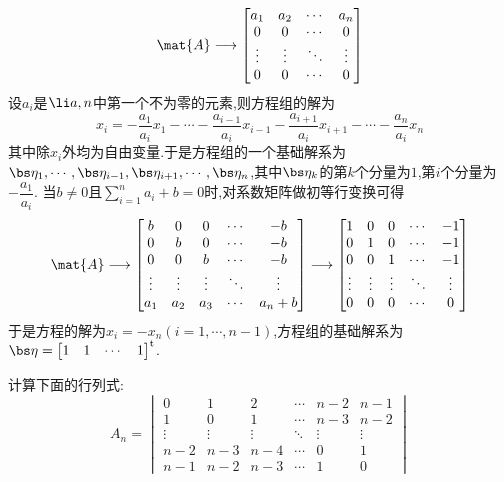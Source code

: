 \documentclass{ctexart}
\begin{document}
\begin{solution}
\begin{enumerate}[label=\tbf{(\arabic*)},topsep=0pt,parsep=0pt,itemsep=0pt,partopsep=0pt]
        \[\mat{A}\longrightarrow\begin{bmatrix}
            a_1&a_2&\cdots&a_n\\
            0&0&\cdots&0\\
            \vdots&\vdots&\ddots&\vdots\\
            0&0&\cdots&0
        \end{bmatrix}\]
        设$a_i$是$\li a,n$中第一个不为零的元素,则方程组的解为
        \[x_i=-\dfrac{a_1}{a_i}x_1-\cdots-\dfrac{a_{i-1}}{a_i}x_{i-1}-\dfrac{a_{i+1}}{a_i}x_{i+1}-\cdots-\dfrac{a_n}{a_i}x_n\]
        其中除$x_i$外均为自由变量.于是方程组的一个基础解系为$\bs\eta_1,\cdots,\bs\eta_{i-1},\bs\eta_{i+1},\cdots,\bs\eta_n$,其中$\bs\eta_{k}$的第$k$个分量为$1$,第$i$个分量为$-\dfrac{a_1}{a_i}$.
        当$b\neq0$且$\displaystyle\sum_{i=1}^{n}a_i+b=0$时,对系数矩阵做初等行变换可得
        \[\mat{A}\longrightarrow\begin{bmatrix}
            b&0&0&\cdots&-b\\
            0&b&0&\cdots&-b\\
            0&0&b&\cdots&-b\\
            \vdots&\vdots&\vdots&\ddots&\vdots\\
            a_1&a_2&a_3&\cdots&a_n+b
        \end{bmatrix}\longrightarrow\begin{bmatrix}
            1&0&0&\cdots&-1\\
            0&1&0&\cdots&-1\\
            0&0&1&\cdots&-1\\
            \vdots&\vdots&\vdots&\ddots&\vdots\\
            0&0&0&\cdots&0
        \end{bmatrix}\]
        于是方程的解为$x_i=-x_n(i=1,\cdots,n-1)$,方程组的基础解系为$\bs\eta=\begin{bmatrix}
            1&1&\cdots&1
        \end{bmatrix}^{\text{t}}$.
    \end{enumerate}
\end{solution}
\begin{homework}[3(15')]
    计算下面的行列式:
    \[A_n=\begin{vmatrix}
        0&1&2&\cdots&n-2&n-1\\
        1&0&1&\cdots&n-3&n-2\\
        \vdots&\vdots&\vdots&\ddots&\vdots&\vdots\\
        n-2&n-3&n-4&\cdots&0&1\\
        n-1&n-2&n-3&\cdots&1&0
    \end{vmatrix}\]
\end{homework}
\end{document}
